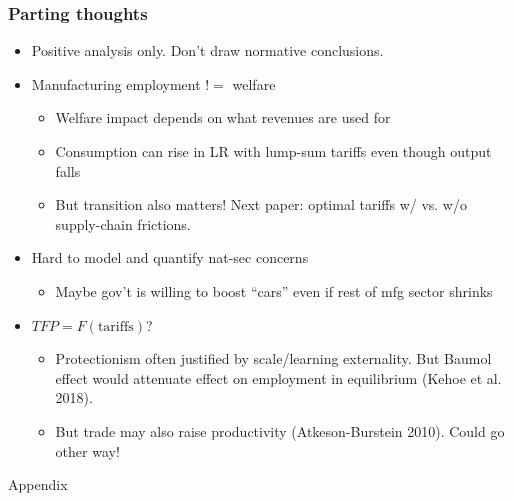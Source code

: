 \documentclass[aspectratio=169,t,10pt,table]{beamer}
\begin{document}
\begin{frame}
  \frametitle{Parting thoughts}
  \begin{itemize}\addtolength{\itemsep}{1ex}
  \item Positive analysis only. Don't draw normative conclusions.
\item Manufacturing employment $!=$ welfare
\begin{itemize}
\item Welfare impact depends on what revenues are used for
    \item Consumption can rise in LR with lump-sum tariffs even though output falls
    \item But transition also matters! Next paper: optimal tariffs w/ vs. w/o supply-chain frictions.
\end{itemize}
      \item Hard to model and quantify nat-sec concerns
      \begin{itemize}
          \item Maybe gov't is willing to boost ``cars'' even if rest of mfg sector shrinks
      \end{itemize}
      \item $TFP = F(\text{tariffs})$?
      \begin{itemize}
          \item Protectionism often justified by scale/learning externality. But Baumol effect would attenuate effect on employment in equilibrium (Kehoe et al. 2018).
          \item But trade may also raise productivity (Atkeson-Burstein 2010). Could go other way!
      \end{itemize}
    \end{itemize}
\end{frame}

\appendix

\begin{transitionframe}
Appendix
\end{transitionframe}
\end{document}
